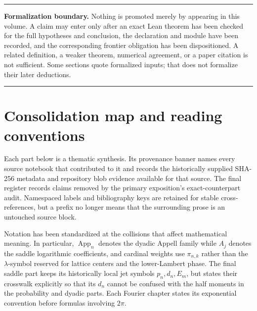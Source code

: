 \documentclass[11pt,oneside]{article}
\theoremstyle{definition}
\theoremstyle{remark}
\newenvironment{boxedremark}{%
  \par\smallskip\noindent\begin{center}\begin{minipage}{0.94\textwidth}%
  \color{black}\hrule\vspace{0.6em}\small
}{%
  \vspace{0.6em}\hrule\end{minipage}\end{center}\smallskip
}
\begin{document}
\begin{boxedremark}
\textbf{Formalization boundary.}
Nothing is promoted merely by appearing in this volume.  A claim may enter
only after an exact Lean theorem has been checked for the full hypotheses and conclusion,
the declaration and module have been recorded, and the corresponding frontier obligation
has been dispositioned.  A related definition, a weaker theorem, numerical agreement, or a
paper citation is not sufficient.  Some sections quote formalized inputs; that does not
formalize their later deductions.
\end{boxedremark}

\tableofcontents
\clearpage

\section*{Consolidation map and reading conventions}
Each part below is a thematic synthesis.  Its provenance banner names every source notebook
that contributed to it and records the historically supplied SHA-256 metadata and repository
blob evidence available for that source.  The final register records claims removed by the
primary exposition's exact-counterpart audit.  Namespaced labels and bibliography keys are
retained for stable cross-references, but a prefix no longer means that the surrounding prose
is an untouched source block.

Notation has been standardized at the collisions that affect mathematical meaning.  In
particular, \(\operatorname{App}_n\) denotes the dyadic Appell family while \(A_j\) denotes
the saddle logarithmic coefficients, and cardinal weights use \(\pi_{n,k}\) rather than the
\(\lambda\)-symbol reserved for lattice centers and the lower-Lambert phase.  The final
saddle part keeps its historically local jet symbols \(p_n,d_n,E_m\), but states their
crosswalk explicitly so that its \(d_n\) cannot be confused with the half moments in the
probability and dyadic parts.  Each Fourier chapter states its exponential convention before
formulas involving \(2\pi\).
\end{document}
